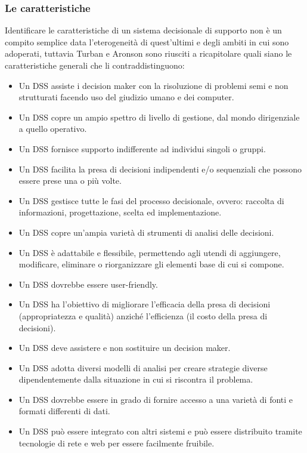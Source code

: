\subsubsection{Le caratteristiche}

Identificare le caratteristiche di un sistema decisionale di supporto non è un compito semplice data l'eterogeneità di quest'ultimi e degli ambiti in cui sono adoperati, tuttavia Turban e Aronson sono riusciti a ricapitolare quali siano le caratteristiche generali che li contraddistinguono:\cite{dss_characteristics}

\begin{itemize}
    \item Un DSS assiste i decision maker con la risoluzione di problemi semi e non strutturati facendo uso del giudizio umano e dei computer.
    \item Un DSS copre un ampio spettro di livello di gestione, dal mondo dirigenziale a quello operativo.
    \item Un DSS fornisce supporto indifferente ad individui singoli o gruppi.
    \item Un DSS facilita la presa di decisioni indipendenti e/o sequenziali che possono essere prese una o più volte.
    \item Un DSS gestisce tutte le fasi del processo decisionale, ovvero: raccolta di informazioni, progettazione, scelta ed implementazione.
    \item Un DSS copre un'ampia varietà di strumenti di analisi delle decisioni.
    \item Un DSS è adattabile e flessibile, permettendo agli utendi di aggiungere, modificare, eliminare o riorganizzare gli elementi base di cui si compone.
    \item Un DSS dovrebbe essere user-friendly.
    \item Un DSS ha l'obiettivo di migliorare l'efficacia della presa di decisioni (appropriatezza e qualità) anziché l'efficienza (il costo della presa di decisioni).
    \item Un DSS deve assistere e non sostituire un decision maker.
    \item Un DSS adotta diversi modelli di analisi per creare strategie diverse dipendentemente dalla situazione in cui si riscontra il problema.
    \item Un DSS dovrebbe essere in grado di fornire accesso a una varietà di fonti e formati differenti di dati.
    \item Un DSS può essere integrato con altri sistemi e può essere distribuito tramite tecnologie di rete e web per essere facilmente fruibile.
\end{itemize}

